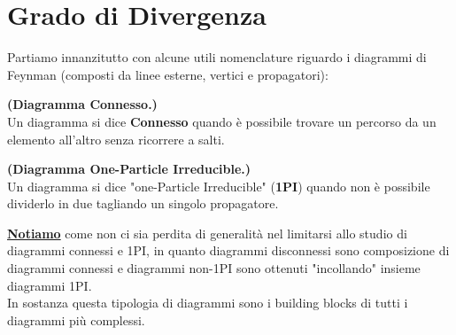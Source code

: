 \documentclass[../main.tex]{subfiles}
\begin{document}
\section{Grado di Divergenza}
Partiamo innanzitutto con alcune utili nomenclature riguardo i diagrammi di Feynman (composti da linee esterne, vertici e propagatori):
\begin{definition}
    \textbf{(Diagramma Connesso.)}\\
    Un diagramma si dice \textbf{Connesso} quando è possibile trovare un percorso da un elemento all'altro senza ricorrere a salti.
    \label{def:connected_diagram}
\end{definition}
\begin{definition}
    \textbf{(Diagramma One-Particle Irreducible.)}\\
    Un diagramma si dice "one-Particle Irreducible" (\textbf{1PI}) quando non è possibile dividerlo in due tagliando un singolo propagatore.
    \label{def:1PI}
\end{definition}

\underline{\textbf{Notiamo}} come non ci sia perdita di generalità nel limitarsi allo studio di diagrammi connessi e 1PI, in quanto diagrammi disconnessi sono composizione di diagrammi connessi e diagrammi non-1PI sono ottenuti "incollando" insieme diagrammi 1PI.\\
In sostanza questa tipologia di diagrammi sono i building blocks di tutti i diagrammi più complessi.
\end{document}
